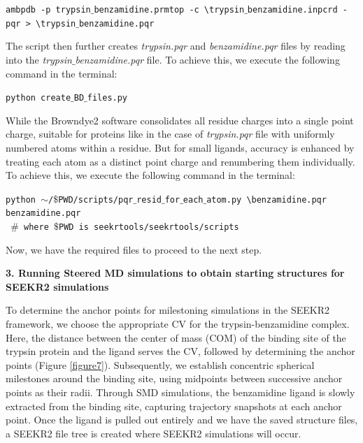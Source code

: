 \documentclass[9pt,training,pubversion]{livecoms}
\begin{document}
\begin{tcolorbox}[colback=black!8!white, colframe=black!50!black, fontlower=\tiny, left=2pt, right=2pt, top=2pt, bottom=2pt] 
\texttt{ambpdb -p trypsin$\_$benzamidine.prmtop -c \textbackslash \linebreak trypsin$\_$benzamidine.inpcrd -pqr > \textbackslash \linebreak trypsin$\_$benzamidine.pqr}
\end{tcolorbox}

\noindent The script then further creates \textit{trypsin.pqr} and \textit{benzamidine.pqr} files by reading into the \textit{trypsin$\_$benzamidine.pqr} file. To achieve this, we execute the following command in the terminal:

\begin{tcolorbox}[colback=black!8!white, colframe=black!50!black, fontlower=\tiny, left=2pt, right=2pt, top=2pt, bottom=2pt] 
\texttt{python create$\_$BD$\_$files.py}
\end{tcolorbox}

\noindent \noindent While the Browndye2 software consolidates all residue charges into a single point charge, suitable for proteins like in the case of \textit{trypsin.pqr} file with uniformly numbered atoms within a residue. But for small ligands, accuracy is enhanced by treating each atom as a distinct point charge and renumbering them individually. To achieve this, we execute the following command in the terminal:

\begin{tcolorbox}[colback=black!8!white, colframe=black!50!black, fontlower=\tiny, left=2pt, right=2pt, top=2pt, bottom=2pt] 
\texttt{python $\sim$/$\$$PWD/scripts/pqr$\_$resid$\_$for$\_$each$\_$atom.py \textbackslash \linebreak benzamidine.pqr benzamidine.pqr} \\
\texttt{ $\#$ where $\$$PWD is seekrtools/seekrtools/scripts} 
\end{tcolorbox}


\noindent Now, we have the required files to proceed to the next step. 

\vspace{2mm}
\noindent \textbf{3. Running Steered MD simulations to obtain starting structures for SEEKR2 simulations} \par
\vspace{2mm}

\noindent To determine the anchor points for milestoning simulations in the SEEKR2 framework, we choose the appropriate CV for the trypsin-benzamidine complex. Here, the distance between the center of mass (COM) of the binding site of the trypsin protein and the ligand serves the CV, followed by determining the anchor points (Figure \ref{figure7}). Subsequently, we establish concentric spherical milestones around the binding site, using midpoints between successive anchor points as their radii. Through SMD simulations, the benzamidine ligand is slowly extracted from the binding site, capturing trajectory snapshots at each anchor point. Once the ligand is pulled out entirely and we have the saved structure files, a SEEKR2 file tree is created where SEEKR2 simulations will occur.  \par
\end{document}
